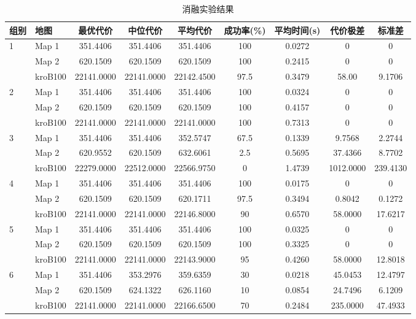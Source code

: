 \documentclass[lettersize,journal]{IEEEtran}
\begin{document}
\begin{table}[!t]

\caption{消融实验结果}
\label{tab:ablation}
\centering
\scriptsize
\begin{tabular}{llccccccc}
\toprule
组别 & 地图 & 最优代价 & 中位代价 & 平均代价 & 成功率(\%) & 平均时间(s) & 代价极差 & 标准差 \\
\midrule
\multirow{3}{*}{1}
& Map 1 & 351.4406 & 351.4406 & 351.4406 & 100 & 0.0272 & 0 & 0 \\
& Map 2 & 620.1509 & 620.1509 & 620.1509 & 100 & 0.2415 & 0 & 0 \\
& kroB100 & 22141.0000 & 22141.0000 & 22142.4500 & 97.5 & 0.3479 & 58.00 & 9.1706 \\
\midrule
\multirow{3}{*}{2}
& Map 1 & 351.4406 & 351.4406 & 351.4406 & 100 & 0.0324 & 0 & 0 \\
& Map 2 & 620.1509 & 620.1509 & 620.1509 & 100 & 0.4157 & 0 & 0 \\
& kroB100 & 22141.0000 & 22141.0000 & 22141.0000 & 100 & 0.7313 & 0 & 0 \\
\midrule
\multirow{3}{*}{3}
& Map 1 & 351.4406 & 351.4406 & 352.5747 & 67.5 & 0.1339 & 9.7568 & 2.2744 \\
& Map 2 & 620.9552 & 620.1509 & 632.6061 & 2.5 & 0.5695 & 37.4366 & 8.7702 \\
& kroB100 & 22279.0000 & 22512.0000 & 22566.9750 & 0 & 1.4739 & 1012.0000 & 239.4130 \\
\midrule
\multirow{3}{*}{4}
& Map 1 & 351.4406 & 351.4406 & 351.4406 & 100 & 0.0175 & 0 & 0 \\
& Map 2 & 620.1509 & 620.1509 & 620.1711 & 97.5 & 0.3494 & 0.8042 & 0.1272 \\
& kroB100 & 22141.0000 & 22141.0000 & 22146.8000 & 90 & 0.6570 & 58.0000 & 17.6217 \\
\midrule
\multirow{3}{*}{5}
& Map 1 & 351.4406 & 351.4406 & 351.4406 & 100 & 0.0325 & 0 & 0 \\
& Map 2 & 620.1509 & 620.1509 & 620.1509 & 100 & 0.3325 & 0 & 0 \\
& kroB100 & 22141.0000 & 22141.0000 & 22143.9000 & 95 & 0.4260 & 58.0000 & 12.8018 \\
\midrule
\multirow{3}{*}{6}
& Map 1 & 351.4406 & 353.2976 & 359.6359 & 30 & 0.0218 & 45.0453 & 12.4797 \\
& Map 2 & 620.1509 & 624.1322 & 626.1160 & 10 & 0.0854 & 24.7496 & 6.1209 \\
& kroB100 & 22141.0000 & 22141.0000 & 22166.6500 & 70 & 0.2484 & 235.0000 & 47.4933 \\
\bottomrule
\end{tabular}
\end{table}
\end{document}
